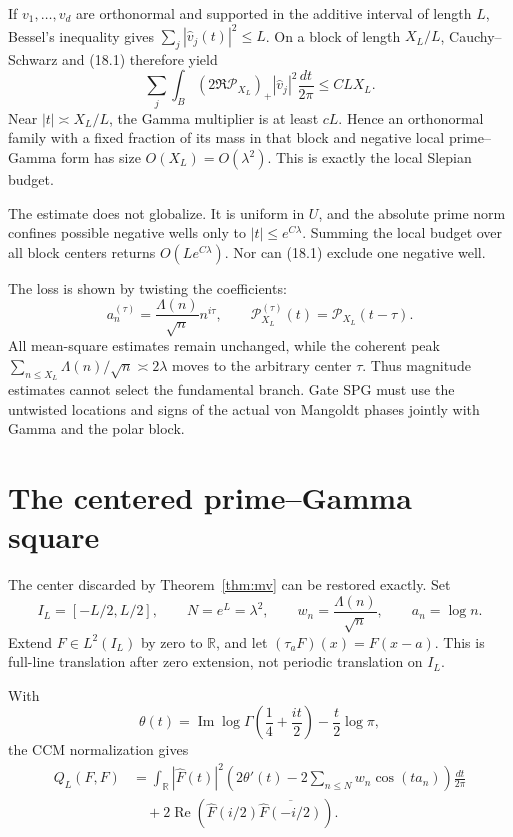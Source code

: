 \documentclass[11pt]{amsart}
\theoremstyle{definition}
\theoremstyle{remark}
\newcommand{\R}{\mathbb R}
\begin{document}
If \(v_1,\ldots,v_d\) are orthonormal and supported in the additive
interval of length \(L\), Bessel's inequality gives
\(\sum_j|\widehat v_j(t)|^2\le L\).  On a block of length \(X_L/L\),
Cauchy--Schwarz and (18.1) therefore yield
\[
 \sum_j\int_B(2\Re\mathcal P_{X_L})_+
       |\widehat v_j|^2\frac{dt}{2\pi}
 \le CLX_L.
 \tag{18.2}
\]
Near \(|t|\asymp X_L/L\), the Gamma multiplier is at least \(cL\).
Hence an orthonormal family with a fixed fraction of its mass in that block
and negative local prime--Gamma form has size \(O(X_L)=O(\lambda^2)\).
This is exactly the local Slepian budget.

The estimate does not globalize.  It is uniform in \(U\), and the absolute
prime norm confines possible negative wells only to
\(|t|\le e^{C\lambda}\).  Summing the local budget over all block centers
returns \(O(Le^{C\lambda})\).  Nor can (18.1) exclude one negative well.

The loss is shown by twisting the coefficients:
\[
 a_n^{(\tau)}=\frac{\Lambda(n)}{\sqrt n}n^{i\tau},
 \qquad
 \mathcal P_{X_L}^{(\tau)}(t)=\mathcal P_{X_L}(t-\tau).
\]
All mean-square estimates remain unchanged, while the coherent peak
\(\sum_{n\le X_L}\Lambda(n)/\sqrt n\asymp2\lambda\) moves to the arbitrary
center \(\tau\).  Thus magnitude estimates cannot select the fundamental
branch.  Gate SPG must use the untwisted locations and signs of the actual
von Mangoldt phases jointly with Gamma and the polar block.

\section{The centered prime--Gamma square}
\label{sec:centered-square}

The center discarded by Theorem~\ref{thm:mv} can be restored exactly.  Set
\[
 I_L=[-L/2,L/2],
 \qquad N=e^L=\lambda^2,
 \qquad w_n=\frac{\Lambda(n)}{\sqrt n},
 \qquad a_n=\log n.
\]
Extend \(F\in L^2(I_L)\) by zero to \(\R\), and let
\((\tau_aF)(x)=F(x-a)\).  This is full-line translation after zero
extension, not periodic translation on \(I_L\).

With
\[
 \theta(t)=
 \operatorname{Im}\log\Gamma\!\left(\frac14+\frac{it}{2}\right)
 -\frac t2\log\pi,
\]
the CCM normalization gives
\[
\begin{aligned}
 Q_L(F,F)
 &=
 \int_\R|\widehat F(t)|^2
 \left(
 2\theta'(t)-2\sum_{n\le N}w_n\cos(ta_n)
 \right)\frac{dt}{2\pi}\\
 &\quad+
 2\operatorname{Re}\!\left(
 \widehat F(i/2)\overline{\widehat F(-i/2)}
 \right).
\end{aligned}
\tag{19.1}
\]
\end{document}
